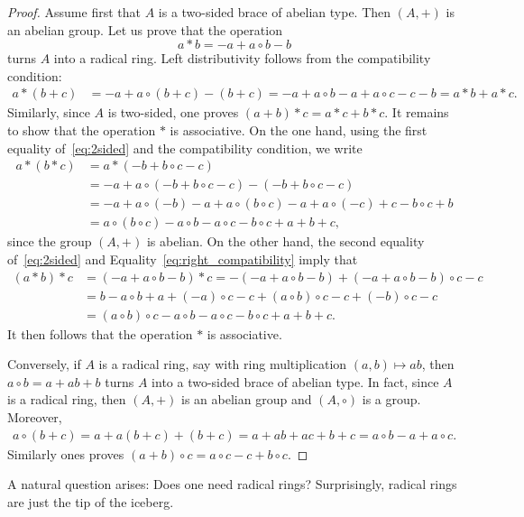 \begin{proof}
    Assume first that $A$ is a two-sided brace of abelian type. Then $(A,+)$ is an abelian group. 
    Let us prove that the operation
    \[
    a*b=-a+a\circ b-b
    \]
    turns $A$ into a radical ring. Left distributivity follows from the compatibility condition:
    \begin{align*}
    a*(b+c)&=-a+a\circ (b+c)-(b+c)
    =-a+a\circ b-a+a\circ c-c-b=a*b+a*c.
    \end{align*}
    Similarly, since $A$ is two-sided, one proves $(a+b)*c=a*c+b*c$. It remains to show that the operation $*$
    is associative. On the one hand, using the first equality of~\eqref{eq:2sided} 
    and the compatibility condition, we write
    \begin{align*}
    a*(b*c)&=a*(-b+b\circ c-c)\\
    &=-a+a\circ(-b+b\circ c-c)-(-b+b\circ c-c)\\
    &=-a+a\circ (-b)-a+a\circ(b\circ c)-a+a\circ (-c)+c-b\circ c+b\\
    &=a\circ (b\circ c)-a\circ b-a\circ c-b\circ c+a+b+c,
    \end{align*}
    since the group $(A,+)$ is abelian. On the other hand, the second equality of~\eqref{eq:2sided} and
    Equality~\eqref{eq:right_compatibility} imply that
    \begin{align*}
    (a*b)*c &= (-a+a\circ b-b)*c=-(-a+a\circ b-b)+(-a+a\circ b-b)\circ c-c\\
    &=b-a\circ b+a+(-a)\circ c-c+(a\circ b)\circ c-c+(-b)\circ c-c\\
    &=(a\circ b)\circ c-a\circ b-a\circ c-b\circ c+a+b+c.
    \end{align*}
    It then follows that the operation $*$ is associative. 
    
    Conversely, if $A$ is a radical ring, say with ring multiplication $(a,b)\mapsto ab$, 
    then $a\circ b=a+ab+b$ turns $A$ into a two-sided brace 
    of abelian type. In fact, since $A$ is a radical ring, then 
    $(A,+)$ is an abelian group and $(A,\circ)$ is a group. Moreover, 
    \begin{align*}
        a\circ (b+c)=a+a(b+c)+(b+c)=a+ab+ac+b+c=a\circ b-a+a\circ c.
    \end{align*}
    Similarly ones proves $(a+b)\circ c=a\circ c-c+b\circ c$.
\end{proof}

A natural question arises: Does one need radical rings? Surprisingly, 
radical rings are just the tip of the iceberg. 

